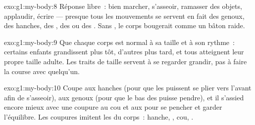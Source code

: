 \begin{solution}{exo:g1:my-body:8}
Réponse libre~: bien marcher, s'asseoir, ramasser des objets,
applaudir, écrire --- presque tous les mouvements se servent en fait
des genoux, des hanches, des , des  ou des .
Sans , le corps bougerait comme un bâton raide.
\end{solution}

\begin{solution}{exo:g1:my-body:9}
Que chaque corps est normal à sa taille et à son rythme~: certains
enfants grandissent plus tôt, d'autres plus tard, et tous
atteignent leur propre taille adulte. Les traits de taille servent à
se regarder grandir, pas à faire la course avec quelqu'un.
\end{solution}

\begin{solution}{exo:g1:my-body:10}
Coupe aux hanches (pour que les  puissent se plier vers
l'avant afin de s'asseoir), aux genoux (pour que le bas des 
puisse pendre), et il s'assied encore mieux avec une coupure au cou
et aux  pour se pencher et garder l'équilibre. Les coupures
imitent les  du corps~: hanche, , cou, .
\end{solution}
